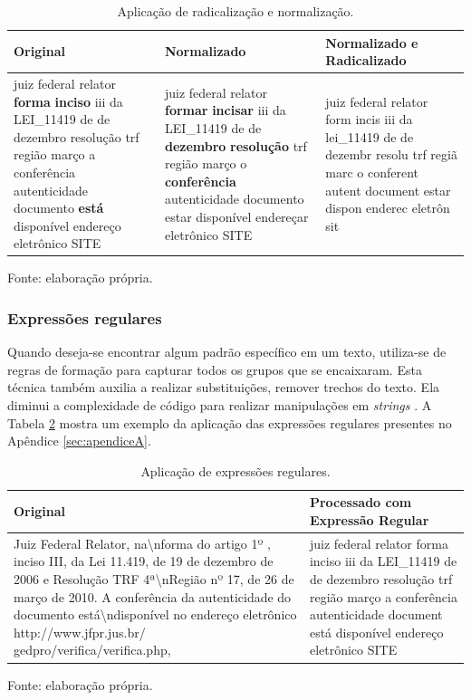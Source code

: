 \begin{table}[ht]
	\centering    
	\caption[Aplicação de radicalização e normalização]{Aplicação de radicalização e normalização.}
    \label{tab:radicalizacaoNormalizacao}
	\begin{tabular}{|p{4cm}|p{4cm}|p{6cm}|}
    \hline
    \textbf{Original} & \textbf{Normalizado} & \textbf{Normalizado e Radicalizado} \\ \hline
	juiz federal relator \textbf{forma} \textbf{inciso} iii da LEI\_11419 de de dezembro resolução trf região março a conferência autenticidade documento \textbf{está} disponível endereço eletrônico SITE & juiz federal relator \textbf{formar} \textbf{incisar} iii da LEI\_11419 de de \textbf{dezembro} \textbf{resolução} trf região março o \textbf{conferência} autenticidade documento estar disponível endereçar eletrônico SITE & juiz federal relator form incis iii da lei\_11419 de de dezembr resolu trf regiã marc o conferent autent document estar dispon enderec eletrôn sit
    \\ \hline
    \end{tabular}\par  Fonte: elaboração própria.
\end{table}

\subsubsection{Expressões regulares}

Quando deseja-se encontrar algum padrão específico em um texto, utiliza-se de regras de formação para capturar todos os grupos que se encaixaram. Esta técnica também  auxilia a realizar substituições, remover trechos do texto. Ela diminui a complexidade de código para realizar manipulações em \textit{strings} \cite{goyvaerts_regular_2012}. A Tabela \ref{tab:regex} mostra um exemplo da aplicação das expressões regulares presentes no Apêndice \ref{sec:apendiceA}.

\begin{table}[ht]
	\centering    
	\caption[Aplicação de expressões regulares]{Aplicação de expressões regulares.}
    \label{tab:regex}
	\begin{tabular}{|p{7cm}|p{7.6cm}|}
    \hline
    \textbf{Original} & \textbf{Processado com Expressão Regular} \\ \hline
	Juiz Federal Relator, na\textbackslash nforma do artigo 1º , inciso III, da Lei 11.419, de 19 de dezembro de 2006 e Resolução TRF 4ª\textbackslash nRegião nº 17, de 26 de março de 2010. A conferência da autenticidade do documento está\textbackslash ndisponível no endereço eletrônico http://www.jfpr.jus.br/ gedpro/verifica/verifica.php, & juiz federal relator forma inciso iii da LEI\_11419 de de dezembro resolução trf região março a conferência autenticidade document está disponível endereço eletrônico SITE \\ \hline
    \end{tabular}\par  Fonte: elaboração própria.
\end{table}

